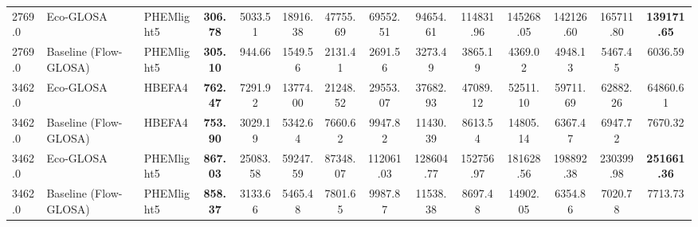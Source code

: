 \begin{table}[htb]
{\begin{tabular}{l l l *{11}{c}}
      2769.0& Eco-GLOSA                  & PHEMlight5   & \textbf{306.78}     & 5033.51    & 18916.38   & 47755.69   & 69552.51   & 94654.61   & 114831.96  & 145268.05  & 142126.60  & 165711.80  & \textbf{139171.65} \\
      2769.0& Baseline (Flow-GLOSA)      & PHEMlight5   & \textbf{305.10}     & 944.66     & 1549.56    & 2131.41    & 2691.56    & 3273.49    & 3865.19    & 4369.02    & 4948.13    & 5467.45    & 6036.59    \\
      \midrule
      3462.0& Eco-GLOSA                  & HBEFA4       & \textbf{762.47}     & 7291.92    & 13774.00   & 21248.52   & 29553.07   & 37682.93   & 47089.12   & 52511.10   & 59711.69   & 62882.26   & 64860.61   \\
      3462.0& Baseline (Flow-GLOSA)      & HBEFA4       & \textbf{753.90}     & 3029.19 & 5342.64    & 7660.62    & 9947.82    & 11430.39   & 8613.54    & 14805.14   & 6367.47    & 6947.72    & 7670.32    \\
      3462.0& Eco-GLOSA                  & PHEMlight5   & \textbf{867.03}     & 25083.58   & 59247.59   & 87348.07   & 112061.03  & 128604.77  & 152756.97  & 181628.56  & 198892.38  & 230399.98  & \textbf{251661.36} \\
      3462.0& Baseline (Flow-GLOSA)      & PHEMlight5   & \textbf{858.37}     & 3133.66    & 5465.48    & 7801.65    & 9987.87    & 11538.38   & 8697.48    & 14902.05   & 6354.86    & 7020.78    & 7713.73    \\
      \bottomrule
    \end{tabular}%
  }
\end{table}

